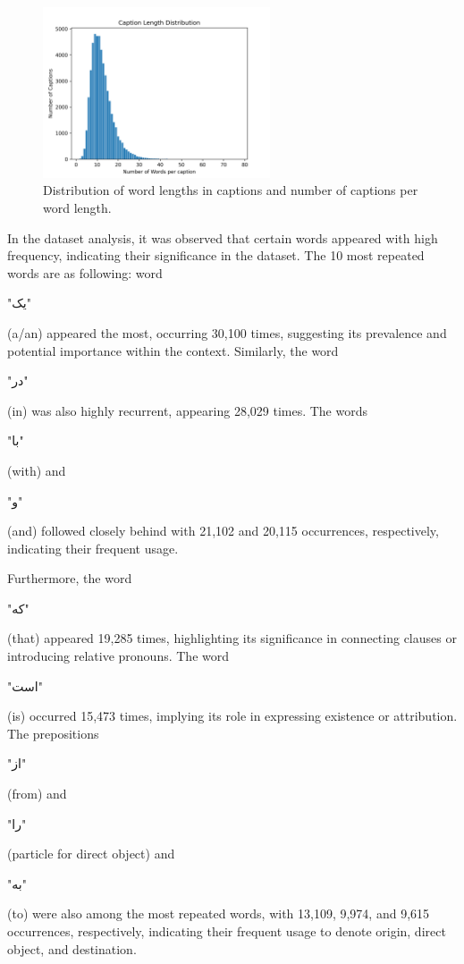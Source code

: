 \documentclass[runningheads]{llncs}
\begin{document}
\begin{figure}
  \begin{center}
    \includegraphics[width=0.6\textwidth]{length_distribution.png}
    \caption{Distribution of word lengths in captions and number of captions per word length.}
    \label{fig3}
  \end{center}
\end{figure}

In the dataset analysis, it was observed that certain words appeared with high frequency, indicating their significance in the dataset. The 10 most repeated words are as following: word \begin{farsi} \arabicfont\small "یک"\end{farsi} (a/an) appeared the most, occurring 30,100 times, suggesting its prevalence and potential importance within the context. Similarly, the word \begin{farsi} \arabicfont\small "در"\end{farsi} (in) was also highly recurrent, appearing 28,029 times. The words \begin{farsi} \arabicfont\small "با"\end{farsi} (with) and \begin{farsi} \arabicfont\small "و"\end{farsi} (and) followed closely behind with 21,102 and 20,115 occurrences, respectively, indicating their frequent usage.

Furthermore, the word \begin{farsi} \arabicfont\small "که"\end{farsi} (that) appeared 19,285 times, highlighting its significance in connecting clauses or introducing relative pronouns. The word \begin{farsi} \arabicfont\small "است"\end{farsi} (is) occurred 15,473 times, implying its role in expressing existence or attribution. The prepositions\begin{farsi} \arabicfont\small "از"\end{farsi} (from) and \begin{farsi} \arabicfont\small "را"\end{farsi} (particle for direct object) and \begin{farsi} \arabicfont\small "به"\end{farsi} (to) were also among the most repeated words, with 13,109, 9,974, and 9,615 occurrences, respectively, indicating their frequent usage to denote origin, direct object, and destination.
\end{document}
